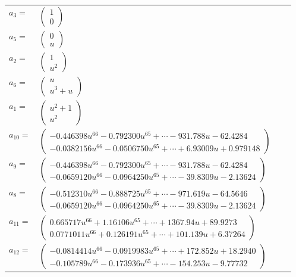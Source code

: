 \documentclass[1p]{elsarticle_modified}
\theoremstyle{definition}
\begin{document}
\begin{tabular}{m{7pt} m{180pt} m{7pt} m{180pt} }
\flushright $a_{3}=$&$\begin{pmatrix}1\\0\end{pmatrix}$ \\
\flushright $a_{5}=$&$\begin{pmatrix}0\\u\end{pmatrix}$ \\
\flushright $a_{2}=$&$\begin{pmatrix}1\\u^2\end{pmatrix}$ \\
\flushright $a_{6}=$&$\begin{pmatrix}u\\u^3+u\end{pmatrix}$ \\
\flushright $a_{1}=$&$\begin{pmatrix}u^2+1\\u^2\end{pmatrix}$ \\
\flushright $a_{10}=$&$\begin{pmatrix}-0.446398 u^{66}-0.792300 u^{65}+\cdots-931.788 u-62.4284\\-0.0382156 u^{66}-0.0506750 u^{65}+\cdots+6.93009 u+0.979148\end{pmatrix}$ \\
\flushright $a_{9}=$&$\begin{pmatrix}-0.446398 u^{66}-0.792300 u^{65}+\cdots-931.788 u-62.4284\\-0.0659120 u^{66}-0.0964250 u^{65}+\cdots-39.8309 u-2.13624\end{pmatrix}$ \\
\flushright $a_{8}=$&$\begin{pmatrix}-0.512310 u^{66}-0.888725 u^{65}+\cdots-971.619 u-64.5646\\-0.0659120 u^{66}-0.0964250 u^{65}+\cdots-39.8309 u-2.13624\end{pmatrix}$ \\
\flushright $a_{11}=$&$\begin{pmatrix}0.665717 u^{66}+1.16106 u^{65}+\cdots+1367.94 u+89.9273\\0.0771011 u^{66}+0.126191 u^{65}+\cdots+101.139 u+6.37264\end{pmatrix}$ \\
\flushright $a_{12}=$&$\begin{pmatrix}-0.0814414 u^{66}-0.0919983 u^{65}+\cdots+172.852 u+18.2940\\-0.105789 u^{66}-0.173936 u^{65}+\cdots-154.253 u-9.77732\end{pmatrix}$ \\

\end{tabular}
\end{document}
